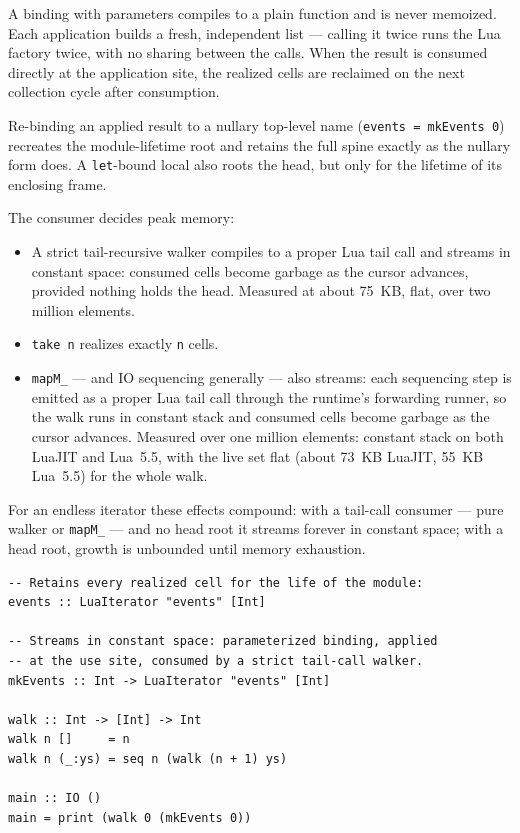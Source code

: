 \documentclass[11pt,a4paper]{article}
\begin{document}
A binding with parameters compiles to a plain function and is never
memoized.  Each application builds a fresh, independent list ---
calling it twice runs the Lua factory twice, with no sharing between
the calls.  When the result is consumed directly at the application
site, the realized cells are reclaimed on the next collection cycle
after consumption.

Re-binding an applied result to a nullary top-level name
(\texttt{events = mkEvents 0}) recreates the module-lifetime root and
retains the full spine exactly as the nullary form does.  A
\texttt{let}-bound local also roots the head, but only for the
lifetime of its enclosing frame.

The consumer decides peak memory:

\begin{itemize}
\item A strict tail-recursive walker compiles to a proper Lua tail
  call and streams in constant space: consumed cells become garbage as
  the cursor advances, provided nothing holds the head.  Measured at
  about 75~KB, flat, over two million elements.
\item \texttt{take n} realizes exactly \texttt{n} cells.
\item \texttt{mapM\_} --- and IO sequencing generally --- also
  streams: each sequencing step is emitted as a proper Lua tail call
  through the runtime's forwarding runner, so the walk runs in
  constant stack and consumed cells become garbage as the cursor
  advances.  Measured over one million elements: constant stack on
  both LuaJIT and Lua~5.5, with the live set flat (about 73~KB
  LuaJIT, 55~KB Lua~5.5) for the whole walk.
\end{itemize}

For an endless iterator these effects compound: with a tail-call
consumer --- pure walker or \texttt{mapM\_} --- and no head root it
streams forever in constant space; with a head root, growth is
unbounded until memory exhaustion.

\begin{lstlisting}
-- Retains every realized cell for the life of the module:
events :: LuaIterator "events" [Int]

-- Streams in constant space: parameterized binding, applied
-- at the use site, consumed by a strict tail-call walker.
mkEvents :: Int -> LuaIterator "events" [Int]

walk :: Int -> [Int] -> Int
walk n []     = n
walk n (_:ys) = seq n (walk (n + 1) ys)

main :: IO ()
main = print (walk 0 (mkEvents 0))
\end{lstlisting}
\end{document}
